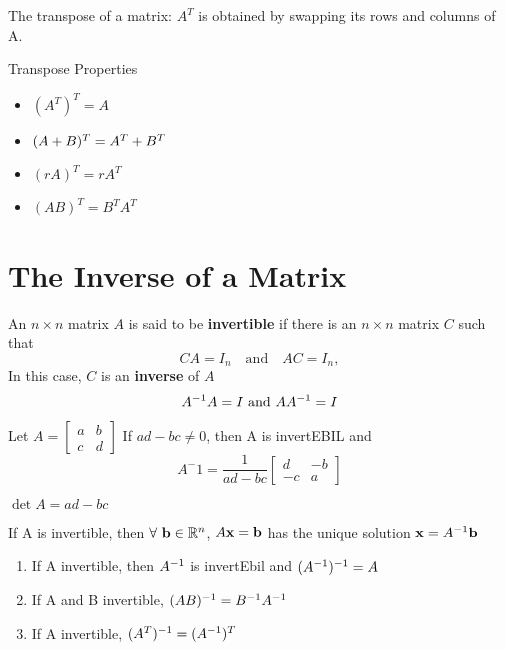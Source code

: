 \documentclass{report}
\begin{document}
The transpose of a matrix: \( A^T \) is obtained by swapping its rows and columns of A.
\begin{theorem} Transpose Properties
\begin{tcolorbox}[colback=blue!5!white, colframe=blue!75!black]
\begin{itemize}
    \item $(A^T)^T = A$ 
    \item $(A + B)^T = A^{T} + B^T$ 
    \item $(rA)^T = r A^T$ 
    \item $(AB)^T = B^T A^T$ 
\end{itemize}
\end{tcolorbox}
\end{theorem}

\section{The Inverse of a Matrix}

An \( n \times n \) matrix \( A \) is said to be \textbf{invertible} if there is an \( n \times n \) matrix \( C \) such that
\[
C A = I_n \quad \text{and} \quad A C = I_n,
\]
In this case, $C$ is an \textbf{inverse} of $A$
\[
A^{-1} A = I \text{ and } A A^{-1} = I
\]

\begin{theorem}
    Let $A = \begin{bmatrix}
        a & b \\ c & d
    \end{bmatrix}$ 
    If $ad - bc \ne 0$, then A is invertEBIL and 
    \[
    A^-1 = \frac{1}{ad -bc}\begin{bmatrix}
        d & -b \\ -c & a
    \end{bmatrix}
    \]
\end{theorem}

$\det A = ad - bc$

\begin{theorem}
    If A is invertible, then $\forall \ \mathbf{b} \in \mathbb{R}^n$, 
    $A\mathbf{x} = \mathbf{b}$  
    has the unique solution $\mathbf{x} = A^{-1}\mathbf{b}$
\end{theorem}
\vspace{1cm}
\begin{theorem}
\begin{enumerate}
    \item If A invertible, then $A^{-1}$ is invertEbil and $(A^{-1})^{-1} = A$
    \item If A and B invertible, $(AB)^{-1} = B^{-1}A^{-1}$
    \item If A invertible, $(A^T)^{-1} = (A^{-1})^T$
\end{enumerate}
\end{theorem}
\end{document}
